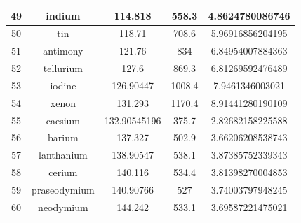 \documentclass[a4paper]{article}
\begin{document}
\begin{center}
\begin{tabular}{|c|c|c|c|c|}
		\hline
		49 & indium & 114.818 & 558.3 & 4.8624780086746 \\
		\hline
		50 & tin & 118.71 & 708.6 & 5.96916856204195 \\
		\hline
		51 & antimony & 121.76 & 834 & 6.84954007884363 \\
		\hline
		52 & tellurium & 127.6 & 869.3 & 6.81269592476489 \\
		\hline
		53 & iodine & 126.90447 & 1008.4 & 7.9461346003021 \\
		\hline
		54 & xenon & 131.293 & 1170.4 & 8.91441280190109 \\
		\hline
		55 & caesium & 132.90545196 & 375.7 & 2.82682158225588 \\
		\hline
		56 & barium & 137.327 & 502.9 & 3.66206208538743 \\
		\hline
		57 & lanthanium & 138.90547 & 538.1 & 3.87385752339343 \\
		\hline
		58 & cerium & 140.116 & 534.4 & 3.81398270004853 \\
		\hline
		59 & praseodymium & 140.90766 & 527 & 3.74003797948245 \\
		\hline
		60 & neodymium & 144.242 & 533.1 & 3.69587221475021 \\
		\hline
	\end{tabular}
	\end{center}
	
\end{document}
